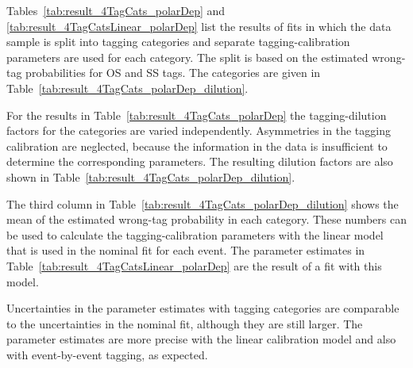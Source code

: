 Tables~\ref{tab:result_4TagCats_polarDep} and \ref{tab:result_4TagCatsLinear_polarDep} list the results of fits in which the data sample is
split into tagging categories and separate tagging-calibration parameters are used for each category. The split is based on the estimated
wrong-tag probabilities for OS and SS tags. The categories are given in Table~\ref{tab:result_4TagCats_polarDep_dilution}.

For the results in Table~\ref{tab:result_4TagCats_polarDep} the tagging-dilution factors for the categories are varied independently.
Asymmetries in the tagging calibration are neglected, because the information in the data is insufficient to determine the corresponding
parameters. The resulting dilution factors are also shown in Table~\ref{tab:result_4TagCats_polarDep_dilution}.

The third column in Table~\ref{tab:result_4TagCats_polarDep_dilution} shows the mean of the estimated wrong-tag probability in each
category. These numbers can be used to calculate the tagging-calibration parameters with the linear model that is used in the nominal fit
for each event. The parameter estimates in Table~\ref{tab:result_4TagCatsLinear_polarDep} are the result of a fit with this model.

Uncertainties in the parameter estimates with tagging categories are comparable to the uncertainties in the nominal fit, although they are
still larger. The parameter estimates are more precise with the linear calibration model and also with event-by-event tagging, as expected.

